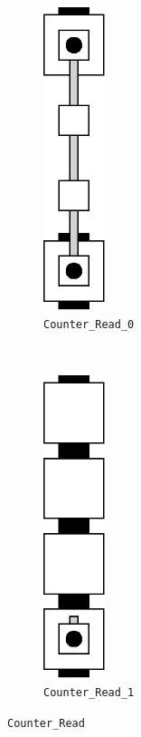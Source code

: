 \begin{figure}[H]
    \centering
    \begin{subfigure}[t]{0.2\textwidth}
        \centering
        \includegraphics[width=0.2\textwidth]{read/read_0}
        \caption{\label{fig:read_0} {\tt Counter\_Read\_0}}
    \end{subfigure}%
    ~
    \begin{subfigure}[t]{0.2\textwidth}
        \centering
        \includegraphics[width=0.2\textwidth]{read/read_1}
        \caption{\label{fig:read_1} {\tt Counter\_Read\_1}}
    \end{subfigure}%
    \caption{\label{fig:counter_read} {\tt {Counter\_Read}}}
\end{figure}
